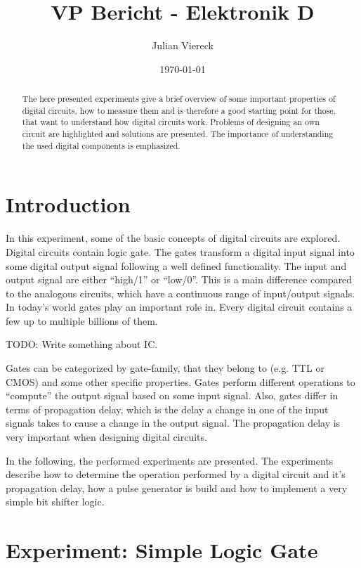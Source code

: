 \documentclass[journal]{IEEEtran}
\title{VP Bericht - Elektronik D}
\author{Julian Viereck}
\date{\today}                                           %
\begin{document}
\maketitle

\begin{abstract}The here presented experiments give a brief overview of some
important properties of digital circuits, how to measure them and is therefore a
good starting point for those, that want to understand how digital circuits work.
Problems of designing an own circuit are highlighted and solutions are presented.
The importance of understanding the used digital components is emphasized.    
\end{abstract}

\tableofcontents

\section{Introduction}

In this experiment, some of the basic concepts of digital circuits are explored.
Digital circuits contain logic gate. The gates transform a
digital input signal into some digital output signal following a well defined functionality.
The input and output signal are either ``high/1'' or ``low/0''. This is a main
difference compared to the analogous circuits, which have a continuous range of
input/output signals. In today's world gates play an important role in. Every
digital circuit contains a few up to multiple billions of them.

TODO: Write something about IC.

Gates can be categorized by gate-family, that they belong to (e.g. TTL or CMOS)
and some other specific properties. Gates perform different operations to
``compute'' the output signal based on some input signal. Also, gates differ in
terms of propagation delay, which is the delay a change in one of the input
signals takes to cause a change in the output signal. The propagation delay is
very important when designing digital circuits.

In the following, the performed experiments are presented. The experiments
describe how to determine the operation performed by a digital circuit and it's
propagation delay, how a pulse generator is build and how to implement a very
simple bit shifter logic.

\section{Experiment: Simple Logic Gate}
\end{document}
